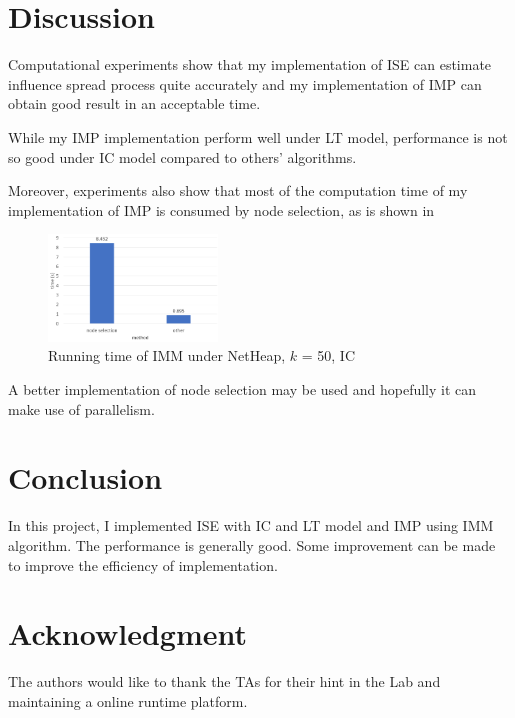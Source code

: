 \documentclass[conference]{IEEEtran}
\begin{document}
    \section{Discussion}

    Computational experiments show that my implementation of ISE can estimate influence spread process quite accurately and my implementation of IMP can obtain good result in an acceptable time.

    While my IMP implementation perform well under LT model, performance is not so good under IC model compared to others' algorithms. 

    Moreover, experiments also show that most of the computation time of my implementation of IMP is consumed by node selection, as is shown in 
    \begin{figure}[H]
    \centering
    \includegraphics[width=0.4\textwidth]{time.png}
    \caption{Running time of IMM under NetHeap, $k$ = 50, IC}
    \label{fig1}
    \end{figure}
    
    A better implementation of node selection may be used and hopefully it can make use of parallelism.

\section{Conclusion}

In this project, I implemented ISE with IC and LT model and IMP using IMM algorithm. The performance is generally good. Some improvement can be made to improve the efficiency of implementation.
\section*{Acknowledgment}

The authors would like to thank the TAs for their hint in the Lab and maintaining a online runtime platform. 







\end{document}
